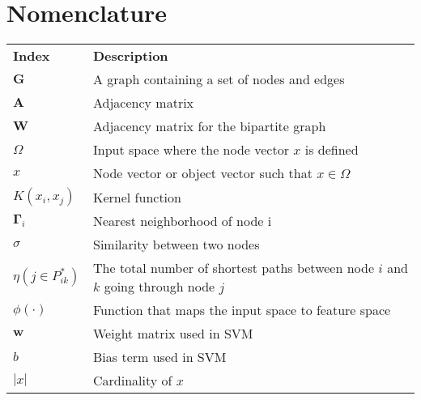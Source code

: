 \chapter*{Nomenclature}

{\centering
\begin{longtabu}{X[2cm,l] X[8cm,p,l]}


\\
\textbf{Index} & \textbf{Description}\\
$\textbf{G}$ & A graph containing a set of nodes and edges\\
$\textbf{A}$ & Adjacency matrix\\
$\textbf{W}$ & Adjacency matrix for the bipartite graph\\
$\Omega$ & Input space where the node vector $x$ is defined\\
$x$ & Node vector or object vector such that $x \in \Omega$\\
$K(x_i,x_j)$ & Kernel function\\
$\bm{\Gamma}_i$ & Nearest neighborhood of node i\\
$\sigma$ & Similarity between two nodes\\
$\eta(j\in P_{ik}^*)$ & The total number of shortest paths between node $i$ and $k$ going through node $j$\\
$\phi(\cdot)$ & Function that maps the input space to feature space\\
$\bm{w}$ & Weight matrix used in SVM\\
$b$ & Bias term used in SVM\\
$|x|$ & Cardinality of $x$


\end{longtabu}}

